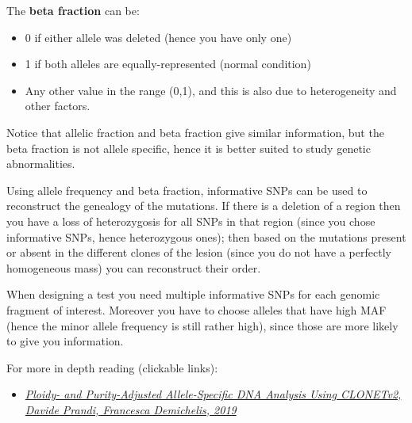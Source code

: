   The \textbf{beta fraction} can be:
  \begin{itemize}
    \item 0 if either allele was deleted (hence you have only one)
    \item 1 if both alleles are equally-represented (normal condition)
    \item Any other value in the range (0,1), and this is also due to heterogeneity and other factors.
  \end{itemize}

  Notice that allelic fraction and beta fraction give similar information, but the beta fraction is not allele specific, hence it is better suited to study genetic abnormalities. 

  Using allele frequency and beta fraction, informative SNPs can be used to reconstruct the genealogy of the mutations. If there is a deletion of a region then you have a loss of heterozygosis for all SNPs in that region (since you chose informative SNPs, hence heterozygous ones); then based on the mutations present or absent in the different clones of the lesion (since you do not have a perfectly homogeneous mass) you can reconstruct their order.  

  When designing a test you need multiple informative SNPs for each genomic fragment of interest. Moreover you have to choose alleles that have high MAF (hence the minor allele frequency is still rather high), since those are more likely to give you information. 

  For more in depth reading (clickable links):
  \begin{itemize}
    \item \href{https://pubmed.ncbi.nlm.nih.gov/31524989/}{\textit{Ploidy- and Purity-Adjusted Allele-Specific DNA Analysis Using CLONETv2, Davide Prandi, Francesca Demichelis, 2019}}
  \end{itemize}

